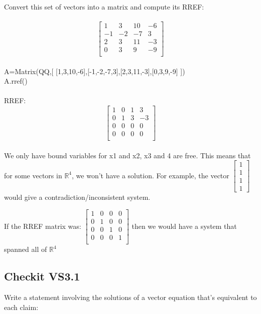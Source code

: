 \documentclass{article}
\begin{document}
{\\
Convert this set of vectors into a matrix and compute its RREF:\\
\\
$$
\begin{bmatrix} 
1 & 3 & 10 & -6\\ 
-1 & -2 & -7 & 3\\
2 & 3 & 11 & -3\\
0 & 3 & 9 & -9\\
\end{bmatrix}
$$\\
A=Matrix(QQ,[ [1,3,10,-6],[-1,-2,-7,3],[2,3,11,-3],[0,3,9,-9] ])\\
A.rref()\\
\\

RREF:\\
$$
\begin{bmatrix} 
1 & 0 & 1 & 3\\ 
0 & 1 & 3 & -3\\
0 & 0 & 0 & 0\\
0 & 0 & 0 & 0\\
\end{bmatrix}
$$\\

We only have bound variables for x1 and x2, x3 and 4 are free. This means that for some vectors in $\mathbb{R}^{4}$, we won't have a solution. For example, the vector $\left[\begin{matrix} 1 \\ 1 \\ 1 \\ 1 \end{matrix}\right]$ would give a contradiction/inconsistent system.

If the RREF matrix was: $\begin{bmatrix} 
1 & 0 & 0 & 0\\ 
0 & 1 & 0 & 0\\
0 & 0 & 1 & 0\\
0 & 0 & 0 & 1\\
\end{bmatrix}
$ then we would have a system that spanned all of $\mathbb{R}^{4}$

\subsection*{Checkit VS3.1}
 Write a statement involving the solutions of a vector equation that's equivalent to each claim: 

}
\end{document}
